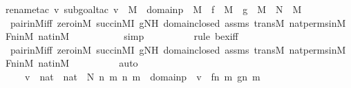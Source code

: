 \begin{isabellebody}
{\isacharparenleft}{\kern0pt}rename{\isacharunderscore}{\kern0pt}tac\ v{\isacharcomma}{\kern0pt}\ subgoal{\isacharunderscore}{\kern0pt}tac\ {\isachardoublequoteopen}v\ {\isasymin}\ M\ {\isasymand}\ domain{\isacharparenleft}{\kern0pt}p{\isacharparenright}{\kern0pt}\ {\isasymin}\ M\ {\isasymand}\ f\ {\isasymin}\ M\ {\isasymand}\ g\ {\isasymin}\ M\ {\isasymand}\ N\ {\isasymin}\ M{\isachardoublequoteclose}{\isacharparenright}{\kern0pt}\isanewline
\ \ \ \ \ \ \ \ \isamarkupfalse%
\ pair{\isacharunderscore}{\kern0pt}in{\isacharunderscore}{\kern0pt}M{\isacharunderscore}{\kern0pt}iff\ zero{\isacharunderscore}{\kern0pt}in{\isacharunderscore}{\kern0pt}M\ succ{\isacharunderscore}{\kern0pt}in{\isacharunderscore}{\kern0pt}MI\ gNH\ domain{\isacharunderscore}{\kern0pt}closed\ assms\ transM\ nat{\isacharunderscore}{\kern0pt}perms{\isacharunderscore}{\kern0pt}in{\isacharunderscore}{\kern0pt}M\ Fn{\isacharunderscore}{\kern0pt}in{\isacharunderscore}{\kern0pt}M\ nat{\isacharunderscore}{\kern0pt}in{\isacharunderscore}{\kern0pt}M\isanewline
\ \ \ \ \ \ \ \ \ \isamarkupfalse%
\ simp\isanewline
\ \ \ \ \ \ \ \ \ \isamarkupfalse%
{\isacharparenleft}{\kern0pt}rule\ bex{\isacharunderscore}{\kern0pt}iff{\isacharparenright}{\kern0pt}{\isacharplus}{\kern0pt}\isanewline
\ \ \ \ \ \ \ \ \isamarkupfalse%
\ pair{\isacharunderscore}{\kern0pt}in{\isacharunderscore}{\kern0pt}M{\isacharunderscore}{\kern0pt}iff\ zero{\isacharunderscore}{\kern0pt}in{\isacharunderscore}{\kern0pt}M\ succ{\isacharunderscore}{\kern0pt}in{\isacharunderscore}{\kern0pt}MI\ gNH\ domain{\isacharunderscore}{\kern0pt}closed\ assms\ transM\ nat{\isacharunderscore}{\kern0pt}perms{\isacharunderscore}{\kern0pt}in{\isacharunderscore}{\kern0pt}M\ Fn{\isacharunderscore}{\kern0pt}in{\isacharunderscore}{\kern0pt}M\ nat{\isacharunderscore}{\kern0pt}in{\isacharunderscore}{\kern0pt}M\isanewline
\ \ \ \ \ \ \ \ \isamarkupfalse%
\ auto\isanewline
\ \ \ \ \ \ \isamarkupfalse%
\ \isamarkupfalse%
\ {\isachardoublequoteopen}{\isachardot}{\kern0pt}{\isachardot}{\kern0pt}{\isachardot}{\kern0pt}\ {\isacharequal}{\kern0pt}\ {\isacharbraceleft}{\kern0pt}\ v\ {\isasymin}\ {\isacharparenleft}{\kern0pt}nat\ {\isasymtimes}\ nat{\isacharparenright}{\kern0pt}\ {\isasymtimes}\ N{\isachardot}{\kern0pt}\ {\isasymexists}n\ m{\isachardot}{\kern0pt}\ {\isacharless}{\kern0pt}n{\isacharcomma}{\kern0pt}\ m{\isachargreater}{\kern0pt}\ {\isasymin}\ domain{\isacharparenleft}{\kern0pt}p{\isacharparenright}{\kern0pt}\ {\isasymand}\ v\ {\isacharequal}{\kern0pt}\ {\isacharless}{\kern0pt}{\isacharless}{\kern0pt}f{\isacharbackquote}{\kern0pt}n{\isacharcomma}{\kern0pt}\ m{\isachargreater}{\kern0pt}{\isacharcomma}{\kern0pt}\ g{\isacharbackquote}{\kern0pt}{\isacharless}{\kern0pt}n{\isacharcomma}{\kern0pt}\ m{\isachargreater}{\kern0pt}{\isachargreater}{\kern0pt}\ {\isacharbraceright}{\kern0pt}{\isachardoublequoteclose}\ \isanewline

\end{isabellebody}
